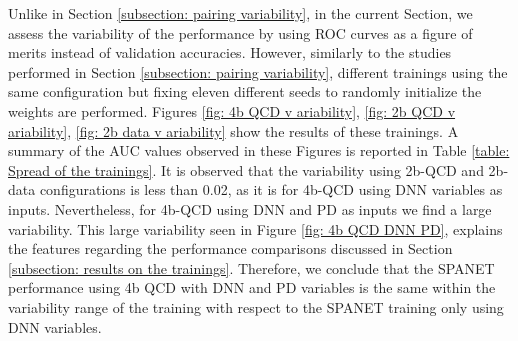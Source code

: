 Unlike in Section \ref{subsection: pairing variability}, in the current Section, we assess the variability of the performance by using ROC curves as a figure of merits instead of validation accuracies. However, similarly to the studies performed in Section \ref{subsection: pairing variability}, different trainings using the same configuration but fixing eleven different seeds to randomly initialize the weights are performed. Figures \ref{fig: 4b QCD v ariability}, \ref{fig: 2b QCD v ariability}, \ref{fig: 2b data v ariability} show the results of these trainings. A summary of the AUC values observed in these Figures is reported in Table \ref{table: Spread of the trainings}. It is observed that the variability using 2b-QCD and 2b-data configurations is less than 0.02, as it is for 4b-QCD using DNN variables as inputs. Nevertheless, for 4b-QCD using DNN and PD as inputs we find a large variability. This large variability seen in Figure \ref{fig: 4b QCD DNN PD}, explains the features regarding the performance comparisons discussed in Section \ref{subsection: results on the trainings}. Therefore, we conclude that the SPANET performance using 4b QCD with DNN and PD variables is the same within the variability range of the training with respect to the SPANET training only using DNN variables.

